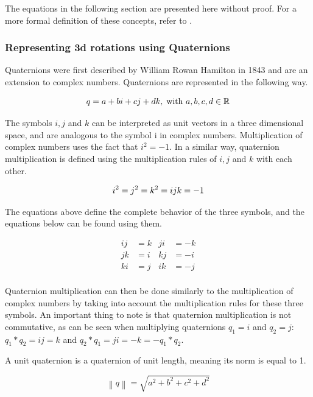 The equations in the following section are presented here without proof. For a more formal definition of these concepts, refer to \cite{quaternions}.

\subsubsection{Representing 3d rotations using Quaternions}

Quaternions were first described by William Rowan Hamilton in 1843 and are an extension to complex numbers. Quaternions are represented in the following way.

\begin{equation}
    q = a + bi + cj + dk, \; \text{with } a, b, c, d \in \mathbb{R} \\
\end{equation}

The symbols \( i, j \) and \( k \) can be interpreted as unit vectors in a three dimensional space, and are analogous to the symbol i in complex numbers. Multiplication of complex numbers uses the fact that \( i^2 = -1 \). In a similar way, quaternion multiplication is defined using the multiplication rules of \( i, j \) and \( k \) with each other.

\begin{equation}
    i^2 = j^2 = k^2 = ijk = -1 \\
\end{equation}

The equations above define the complete behavior of the three symbols, and the equations below can be found using them.

\begin{align*}
    ij &= k & ji &= -k \\
    jk &= i & kj &= -i \\
    ki &= j & ik &= -j \\
\end{align*}

Quaternion multiplication can then be done similarly to the multiplication of complex numbers by taking into account the multiplication rules for these three symbols. An important thing to note is that quaternion multiplication is not commutative, as can be seen when multiplying quaternions \( q_1 = i \) and \( q_2 = j \): \( q_1*q_2 = ij = k \) and \( q_2*q_1 = ji = -k = -q_1*q_2 \). 

A unit quaternion is a quaternion of unit length, meaning its norm is equal to 1. 

\begin{equation}
    \left \| q \right \| = \sqrt{a^2 + b^2 + c^2 + d^2}
\end{equation}

